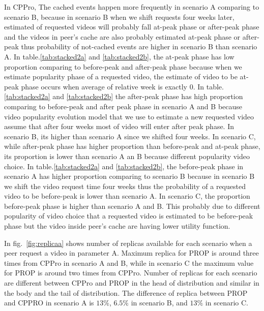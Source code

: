 \documentclass[10pt,final,journal,a4paper]{IEEEtran}
\begin{document}
In CPPro, The cached events happen more frequently in scenario A comparing to scenario B, because in scenario B when we shift requests four weeks later, estimated of requested videos will probably fall at-peak phase or after-peak phase and the videos in peer's cache are also probably estimated at-peak phase or after-peak thus probability of not-cached events are higher in scenario B than scenario A.
In table.\ref{tab:stacked2a} and \ref{tab:stacked2b}, the at-peak phase has low proportion comparing to before-peak and after-peak phase because when we estimate popularity phase of a requested video, the estimate of video to be at-peak phase occurs when average of relative week is exactly $0$. 
In table.\ref{tab:stacked2a} and \ref{tab:stacked2b} the after-peak phase has high proportion comparing to before-peak and after peak phase in scenario A and B because video popularity evolution model that we use to estimate a new requested video assume that after four weeks most of video will enter after peak phase. 
In scenario B, its higher than scenario A since we shifted four weeks. 
In scenario C, while after-peak phase has higher proportion than before-peak and at-peak phase, its proportion is lower than scenario A an B because different popularity video choice.
In table.\ref{tab:stacked2a} and \ref{tab:stacked2b}, the before-peak phase in scenario A has higher proportion comparing to scenario B because in scenario B we shift the video request time four weeks thus the probability of a requested video to be before-peak is lower than scenario A. 
In scenario C, the proportion before-peak phase is higher than scenario A and B. 
This probably due to different popularity of video choice that a requested video is estimated to be before-peak phase but the video inside peer's cache are having lower utility function.



In fig.~\ref{fig:replicaa} shows number of replicas available for each scenario when a peer request a video in parameter A.
Maximum replica for PROP is around three times from CPPro in scenario A and B, while in scenario C the maximum value for PROP is around two times from CPPro.
Number of replicas for each scenario are different between CPPro and PROP in the head of distribution and similar in the body and the tail of distribution. 
The difference of replica between PROP and CPPRO in scenario A is $13\%$, $6.5\%$ in scenario B, and $13\%$ in scenario C.
\end{document}
